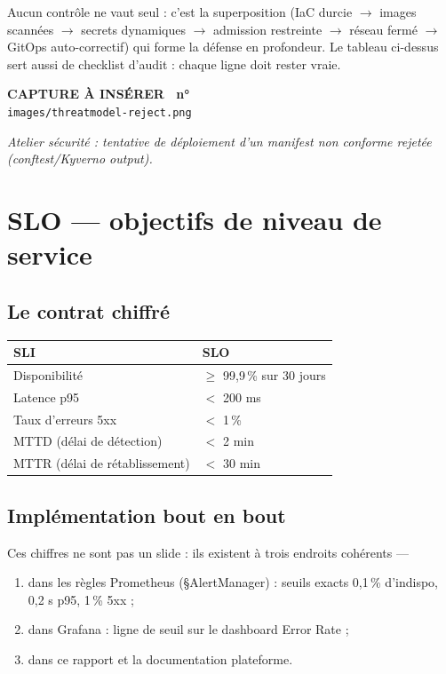 \documentclass[12pt,a4paper]{article}
\newcounter{capturecount}
\newcommand{\capturebox}[2]{%
\par\vspace{4mm}
\begin{tcolorbox}[enhanced,colback=yellow!5,colframe=black!55,boxrule=0.7pt,
  borderline={0.7pt}{0pt}{black!40,dashed},
  arc=2mm,left=6pt,right=6pt,top=7pt,bottom=7pt]
\centering
{\normalsize\sffamily\bfseries CAPTURE À INSÉRER \textbar\ n°\,\stepcounter{capturecount}\thecapturecount}\\[3pt]
{\large\texttt{images/#2}}\\[7pt]
\begin{minipage}{0.94\linewidth}\centering\itshape #1\end{minipage}
\end{tcolorbox}
\par\vspace{2mm}}
\begin{document}
\begin{whybox}
Aucun contrôle ne vaut seul : c'est la superposition (IaC durcie $\rightarrow$ images scannées $\rightarrow$ secrets dynamiques $\rightarrow$ admission restreinte $\rightarrow$ réseau fermé $\rightarrow$ GitOps auto-correctif) qui forme la défense en profondeur. Le tableau ci-dessus sert aussi de checklist d'audit : chaque ligne doit rester vraie.
\end{whybox}

\capturebox{Atelier sécurité : tentative de déploiement d'un manifest non conforme rejetée (conftest/Kyverno output).}{threatmodel-reject.png}

\section{SLO --- objectifs de niveau de service}

\subsection{Le contrat chiffré}
\begin{tabular}{@{}ll@{}}
\toprule
\textbf{SLI} & \textbf{SLO} \\
\midrule
Disponibilité & $\geq$ 99,9\,\% sur 30 jours \\
Latence p95 & $<$ 200 ms \\
Taux d'erreurs 5xx & $<$ 1\,\% \\
MTTD (délai de détection) & $<$ 2 min \\
MTTR (délai de rétablissement) & $<$ 30 min \\
\bottomrule
\end{tabular}

\subsection{Implémentation bout en bout}
Ces chiffres ne sont pas un slide : ils existent à trois endroits cohérents ---
\begin{enumerate}[itemsep=1pt]
  \item dans les règles Prometheus (\S AlertManager) : seuils exacts 0,1\,\% d'indispo, 0,2 s p95, 1\,\% 5xx ;
  \item dans Grafana : ligne de seuil sur le dashboard Error Rate ;
  \item dans ce rapport et la documentation plateforme.
\end{enumerate}
\end{document}
